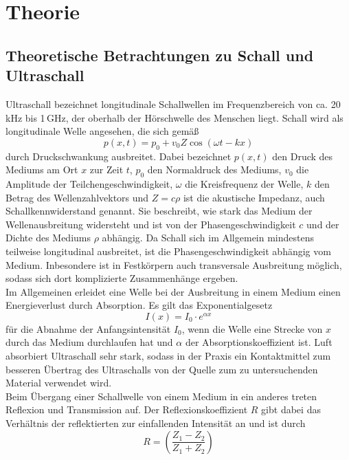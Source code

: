 \section{Theorie}
\label{sec:Theorie}
\subsection{Theoretische Betrachtungen zu Schall und Ultraschall}
\label{subsec:theorie1}
Ultraschall bezeichnet longitudinale Schallwellen im Frequenzbereich von ca.
20\,kHz bis 1\,GHz, der oberhalb der Hörschwelle des Menschen liegt.
Schall wird als longitudinale Welle angesehen, die sich gemäß
\begin{equation}
  p(x,t) = p_0 + v_0 Z \cos(\omega t - kx)
\end{equation}
durch Druckschwankung ausbreitet. Dabei bezeichnet $p(x,t)$ den Druck des Mediums
am Ort $x$ zur Zeit $t$, $p_0$ den Normaldruck des Mediums, $v_0$ die Amplitude der Teilchengeschwindigkeit,
$\omega$ die Kreisfrequenz der Welle, $k$ den Betrag des Wellenzahlvektors und $Z = c \rho$ ist die akustische
Impedanz, auch Schallkennwiderstand genannt. Sie beschreibt, wie stark das Medium
der Wellenausbreitung widersteht und ist von der Phasengeschwindigkeit $c$ und der
Dichte des Mediums $\rho$ abhängig. Da Schall sich im Allgemein mindestens teilweise
longitudinal ausbreitet, ist die Phasengeschwindigkeit abhängig vom Medium. Inbesondere
ist in Festkörpern auch transversale Ausbreitung möglich, sodass sich dort komplizierte Zusammenhänge
ergeben.\\
Im Allgemeinen erleidet eine Welle bei der Ausbreitung in einem Medium einen Energieverlust
durch Absorption. Es gilt das Exponentialgesetz
\begin{equation}
  I(x) = I_0 \cdot e^{\alpha x}
\end{equation}
für die Abnahme der Anfangsintensität $I_0$, wenn die Welle eine Strecke von $x$ durch
das Medium durchlaufen hat und $\alpha$ der Absorptionskoeffizient ist.
Luft absorbiert Ultraschall sehr stark, sodass in der Praxis ein Kontaktmittel
zum besseren Übertrag des Ultraschalls von der Quelle zum zu untersuchenden Material
verwendet wird.\\
Beim Übergang einer Schallwelle von einem Medium in ein anderes treten Reflexion und
Transmission auf. Der Reflexionskoeffizient $R$ gibt dabei das Verhältnis der reflektierten
zur einfallenden Intensität an und ist durch
\begin{equation}
R = \left( \frac{Z_1-Z_2}{Z_1+Z_2} \right)
\end{equation}
